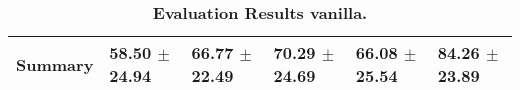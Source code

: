 \begin{table}[htb]
{\begin{tabular}{llllll}
\midrule
\textbf{Summary                                  } &                  \phantom{0}58.50 $\pm$ 24.94 &                      \phantom{0}66.77 $\pm$ 22.49 &                  \phantom{0}70.29 $\pm$ 24.69 &                  \phantom{0}66.08 $\pm$ 25.54 &            \phantom{0}84.26 $\pm$ 23.89 \\
\bottomrule
\end{tabular}%
}
\caption{\textbf{Evaluation Results vanilla.}}
\label{tab:eval-results}
\end{table}



